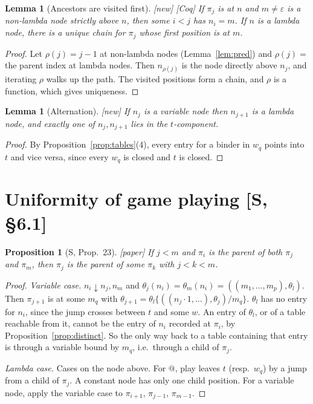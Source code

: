 \documentclass[11pt]{article}
\newcommand{\bnd}{\mathrel{\downarrow}}
\newcommand{\suc}[2]{#1{\cdot}#2}
\newcommand{\Paper}{\textsf{[paper]}}
\newcommand{\New}{\textsf{[new]}}
\newcommand{\Coq}{\textsf{[Coq]}}
\theoremstyle{plain}
\newtheorem{proposition}[theorem]{Proposition}
\newtheorem{lemma}[theorem]{Lemma}
\theoremstyle{definition}
\theoremstyle{remark}
\begin{document}
\begin{lemma}[Ancestors are visited first]\label{lem:ancestors}
\New{} \Coq{} If $\pi_j$ is at $n$ and $m\ne\varepsilon$ is a
non-lambda node strictly above $n$, then some $i<j$ has $n_i=m$.  If $n$
is a lambda node, there is a unique chain for $\pi_j$ whose first
position is at $m$.
\end{lemma}
\begin{proof}
Let $\rho(j)=j-1$ at non-lambda nodes (Lemma~\ref{lem:pred}) and
$\rho(j)=$ the parent index at lambda nodes.  Then $n_{\rho(j)}$ is the
node directly above $n_j$, and iterating $\rho$ walks up the path.
The visited positions form a chain, and $\rho$ is a function, which
gives uniqueness.
\end{proof}

\begin{lemma}[Alternation]\label{lem:alt}
\New{} If $n_j$ is a variable node then $n_{j+1}$ is a lambda node, and
exactly one of $n_j,n_{j+1}$ lies in the $t$-component.
\end{lemma}
\begin{proof}
By Proposition~\ref{prop:tables}(4), every entry for a binder in $w_q$
points into $t$ and vice versa, since every $w_q$ is closed and $t$ is
closed.
\end{proof}

\section{Uniformity of game playing [S, \S6.1]}\label{sec:uniformity}

\begin{proposition}[S, Prop.~23]\label{prop:between}
\Paper{} If $j<m$ and $\pi_i$ is the parent of both $\pi_j$ and $\pi_m$,
then $\pi_j$ is the parent of some $\pi_k$ with $j<k<m$.
\end{proposition}
\begin{proof}
\emph{Variable case.} $n_i\bnd n_j,n_m$ and
$\theta_j(n_i)=\theta_m(n_i)=((m_1,\dots,m_p),\theta_l)$.  Then $\pi_{j+1}$ is
at some $m_q$ with $\theta_{j+1}=\theta_l\{((\suc{n_j}1,\dots),\theta_j)/m_q\}$.
$\theta_l$ has no entry for $n_i$, since the jump crosses between $t$ and
some $w$.  An entry of $\theta_l$, or of a table reachable from it,
cannot be the entry of $n_i$ recorded at $\pi_i$, by
Proposition~\ref{prop:distinct}.  So the only way back to a table
containing that entry is through a variable bound by $m_q$, i.e.\
through a child of $\pi_j$.

\emph{Lambda case.} Cases on the node above.  For $@$, play leaves $t$
(resp.\ $w_q$) by a jump from a child of $\pi_j$.  A constant node has
only one child position.  For a variable node, apply the variable case
to $\pi_{i+1}$, $\pi_{j-1}$, $\pi_{m-1}$.
\end{proof}
\end{document}

